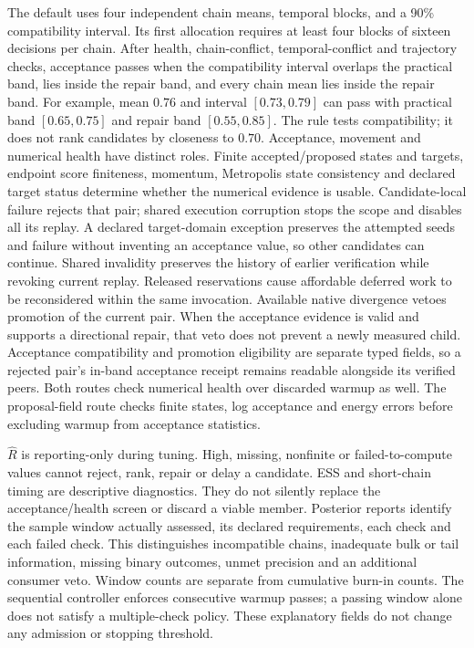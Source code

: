 The default  uses four independent chain means,
temporal blocks, and a 90\% compatibility interval. Its first allocation
requires at least four blocks of sixteen decisions per chain. After health,
chain-conflict, temporal-conflict and trajectory checks, acceptance passes when
the compatibility interval overlaps the practical band, lies inside the repair
band, and every chain mean lies inside the repair band. For example, mean
$0.76$ and interval $[0.73,0.79]$ can pass with practical band $[0.65,0.75]$
and repair band $[0.55,0.85]$. The rule tests compatibility; it does not rank
candidates by closeness to $0.70$. Acceptance,
movement and numerical health have distinct roles. Finite accepted/proposed
states and targets, endpoint score finiteness, momentum, Metropolis state
consistency and declared target status determine
whether the numerical evidence is usable. Candidate-local failure rejects that
pair; shared execution corruption stops the scope and disables all its replay.
A declared target-domain exception preserves the attempted seeds and failure
without inventing an acceptance value, so other candidates can continue.
Shared invalidity preserves the history of earlier verification while revoking
current replay. Released reservations cause affordable deferred work to be
reconsidered within the same invocation.
Available native divergence vetoes promotion of the current pair. When the
acceptance evidence is valid and supports a directional repair, that veto does
not prevent a newly measured child. Acceptance compatibility and promotion
eligibility are separate typed fields, so a rejected pair's in-band acceptance
receipt remains readable alongside its verified peers.
Both routes check numerical health over discarded warmup as well. The
proposal-field route checks finite states, log acceptance and energy errors
before excluding warmup from acceptance statistics.

$\widehat R$ is reporting-only during tuning. High, missing, nonfinite or
failed-to-compute values cannot reject, rank, repair or delay a candidate.
ESS and short-chain timing are descriptive diagnostics. They do not silently
replace the acceptance/health screen or discard a viable member.
Posterior reports identify the sample window actually assessed, its declared
requirements, each check and each failed check. This distinguishes incompatible
chains, inadequate bulk or tail information, missing binary outcomes, unmet
precision and an additional consumer veto. Window counts are separate from
cumulative burn-in counts. The sequential controller enforces consecutive
warmup passes; a passing window alone does not satisfy a multiple-check policy.
These explanatory fields do not change any admission or stopping threshold.

